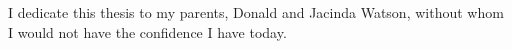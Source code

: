 I dedicate this thesis to my parents, Donald and Jacinda Watson, without whom I would not have the confidence I have today.